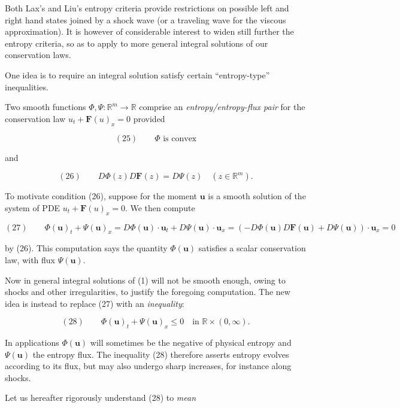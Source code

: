 Both Lax's and Liu's entropy criteria provide restrictions on possible left and right hand states joined by a shock wave (or a traveling wave for the viscous approximation). It is however of considerable interest to widen still further the entropy criteria, so as to apply to more general integral solutions of our conservation laws.

One idea is to require an integral solution satisfy certain ``entropy-type'' inequalities.

\begin{definition}
\label{def:entropy-entropy-flux-pair-system}
Two smooth functions $\Phi, \Psi:\mathbb{R}^m\to\mathbb{R}$ comprise an \textit{entropy/entropy-flux pair} for the conservation law $u_t + \mathbf{F}(u)_x = 0$ provided

$$(25) \qquad \Phi \text{ is convex}$$

and

$$(26) \qquad D\Phi(z)D\mathbf{F}(z) = D\Psi(z) \quad (z\in\mathbb{R}^m).$$
\end{definition}

To motivate condition (26), suppose for the moment $\mathbf{u}$ is a smooth solution of the system of PDE $u_t + \mathbf{F}(u)_x = 0$. We then compute

$$(27) \qquad \Phi(\mathbf{u})_t + \Psi(\mathbf{u})_x = D\Phi(\mathbf{u})\cdot\mathbf{u}_t + D\Psi(\mathbf{u})\cdot\mathbf{u}_x = (-D\Phi(\mathbf{u})D\mathbf{F}(\mathbf{u}) + D\Psi(\mathbf{u}))\cdot\mathbf{u}_x = 0$$

by (26). This computation says the quantity $\Phi(\mathbf{u})$ satisfies a scalar conservation law, with flux $\Psi(\mathbf{u})$.

Now in general integral solutions of (1) will not be smooth enough, owing to shocks and other irregularities, to justify the foregoing computation. The new idea is instead to replace (27) with an \textit{inequality}:

$$(28) \qquad \Phi(\mathbf{u})_t + \Psi(\mathbf{u})_x \leq 0 \quad \text{in } \mathbb{R}\times(0,\infty).$$

In applications $\Phi(\mathbf{u})$ will sometimes be the negative of physical entropy and $\Psi(\mathbf{u})$ the entropy flux. The inequality (28) therefore asserts entropy evolves according to its flux, but may also undergo sharp increases, for instance along shocks.

Let us hereafter rigorously understand (28) to \textit{mean}

